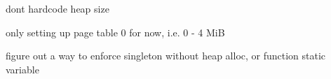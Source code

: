 
\begin{DoxyRefList}
\item[\label{todo__todo000002}%
\Hypertarget{todo__todo000002}%
Member \hyperlink{namespace_i_n_i_t_ac811302ce0948a6a097b445b811f9c14}{I\+N\+IT\+:\+:K\+M\+A\+L\+L\+OC} ()]don\textquotesingle{}t hardcode heap size  
\item[\label{todo__todo000003}%
\Hypertarget{todo__todo000003}%
Member \hyperlink{namespace_i_n_i_t_aea383d3de30095cf9d176fa60b66d01d}{I\+N\+IT\+:\+:P\+A\+GE} ()]only setting up page table 0 for now, i.\+e. 0 -\/ 4 MiB  
\item[\label{todo__todo000001}%
\Hypertarget{todo__todo000001}%
Class \hyperlink{class_k_m_1_1_memory_allocator}{KM\+:\+:Memory\+Allocator} ]figure out a way to enforce singleton without heap alloc, or function static variable 
\end{DoxyRefList}